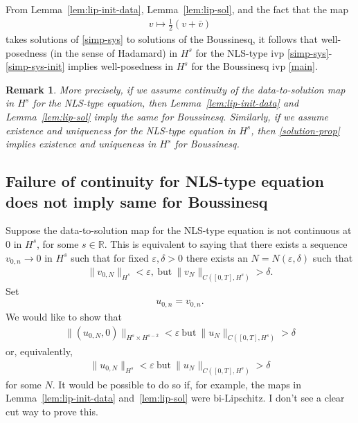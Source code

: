 \documentclass{amsart}
\newtheorem{remark}[theorem]{Remark}
\newcommand{\rr}{\mathbb{R}}
\newcommand{\ee}{\varepsilon}
\begin{document}
From Lemma~\ref{lem:lip-init-data}, Lemma~\ref{lem:lip-sol}, and the fact that
the map
%
%
\begin{equation}
  \label{solution-prop}
\begin{split}
  v \mapsto \frac{1}{2} (v + \bar{v}) 
\end{split}
\end{equation}
%
%
takes solutions of \eqref{simp-sys} to solutions of the Boussinesq, it follows
that well-posedness (in the sense of Hadamard) in $H^{s}$ for the NLS-type ivp
\eqref{simp-sys}-\eqref{simp-sys-init} 
implies well-posedness in $H^{s}$ for the Boussinesq ivp \eqref{main}.
%
%
\begin{framed}
%
%
\begin{remark}
More precisely, if we assume continuity of the data-to-solution map in $H^{s}$ for the NLS-type equation, then Lemma~\ref{lem:lip-init-data}
and Lemma~\ref{lem:lip-sol} imply the same for Boussinesq. Similarly, if we assume existence and uniqueness for the NLS-type equation in $H^{s}$, then 
\eqref{solution-prop} implies existence and uniqueness in
$H^{s}$ for Boussinesq.
\label{rem:wp-imp-wp}
\end{remark}
%
%
\end{framed}
%
\subsection{Failure of continuity for NLS-type equation does not imply same for Boussinesq} 
\label{ssec:ip-no-ip}
%
Suppose the data-to-solution map for the NLS-type equation is not continuous at
$0$ in $H^{s}$, for some $s \in \rr$. This is equivalent to saying that 
there exists a sequence $v_{0,n} \to 0$ in $H^{s}$ such that for fixed $\ee, \delta > 0$ there exists an $N = N(\ee, \delta)$ such that
%
%
\begin{equation*}
\begin{split}
\| v_{0,N} \|_{H^{s}} < \ee, \ \text{but} \ \| v_{N} \|_{C([0,T], H^{s})} >
\delta.
\end{split}
\end{equation*}
%
%
Set
%
%
\begin{equation*}
\begin{split}
u_{0,n} = v_{0,n}.
\end{split}
\end{equation*}
%
%
We would like to show that
%
%
\begin{equation*}
\begin{split}
\| (u_{0,N}, 0) \|_{H^{s} \times H^{s-2}} < \ee \ \text{but} \ \| u_{N} \|_{C([0,T], H^{s})} > \delta
\end{split}
\end{equation*}
%
%
%
%
%
%
or, equivalently, 
%
%
\begin{equation*}
\begin{split}
\| u_{0,N} \|_{H^{s}} < \ee \ \text{but} \ \| u_{N} \|_{C([0, T], H^{s})} >
\delta
\end{split}
\end{equation*}
%
for some $N$. It would be possible to do so if, for example, the maps in Lemma~\ref{lem:lip-init-data} and~\ref{lem:lip-sol} were bi-Lipschitz. I don't see a
clear cut way to prove this.
%
%
\end{document}
